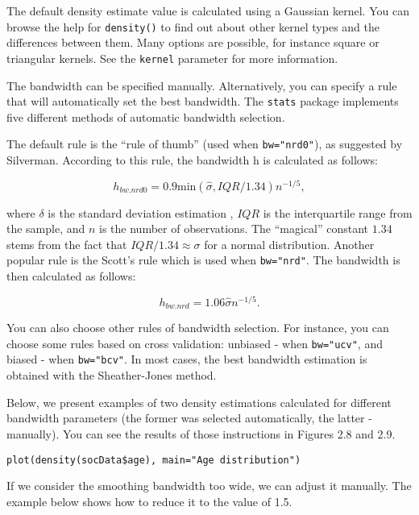 \documentclass[]{book}
\theoremstyle{definition}
\theoremstyle{definition}
\theoremstyle{definition}
\theoremstyle{remark}
\begin{document}
The default density estimate value is calculated using a Gaussian
kernel. You can browse the help for \texttt{density()} to find out about
other kernel types and the differences between them. Many options are
possible, for instance square or triangular kernels. See the
\texttt{kernel} parameter for more information.

The bandwidth can be specified manually. Alternatively, you can specify
a rule that will automatically set the best bandwidth. The
\texttt{stats} package implements five different methods of automatic
bandwidth selection.

The default rule is the ``rule of thumb'' (used when
\texttt{bw="nrd0"}), as suggested by Silverman. According to this rule,
the bandwidth h is calculated as follows:

\begin{equation}
h_{bw.nrd0}=0.9\textrm{min}(\hat{\sigma}, IQR/1.34)n^{-1/5},
\label{eq:bwnrd0}
\end{equation}

where \(\delta\) is the standard deviation estimation , \(IQR\) is the
interquartile range from the sample, and \(n\) is the number of
observations. The ``magical'' constant \(1.34\) stems from the fact that
\(IQR/1.34\approx\sigma\) for a normal distribution. Another popular
rule is the Scott's rule which is used when \texttt{bw="nrd"}. The
bandwidth is then calculated as follows:

\begin{equation}
h_{bw.nrd}=1.06\hat{\sigma} n^{-1/5}.
\label{eq:bwnrd}
\end{equation}

You can also choose other rules of bandwidth selection. For instance,
you can choose some rules based on cross validation: unbiased - when
\texttt{bw="ucv"}, and biased - when \texttt{bw="bcv"}. In most cases,
the best bandwidth estimation is obtained with the Sheather-Jones
method.

Below, we present examples of two density estimations calculated for
different bandwidth parameters (the former was selected automatically,
the latter - manually). You can see the results of those instructions in
Figures 2.8 and 2.9.

\begin{verbatim}
plot(density(socData$age), main="Age distribution")
\end{verbatim}

If we consider the smoothing bandwidth too wide, we can adjust it
manually. The example below shows how to reduce it to the value of 1.5.
\end{document}
